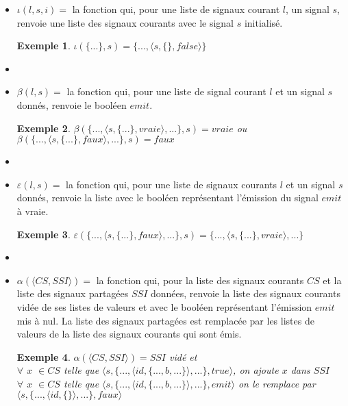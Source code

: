 \documentclass[10pt,a4paper]{report}
\newtheorem{ex}{Exemple}
\begin{document}
\begin{itemize}
		\item[] $\iota(l,s,i) =$ la fonction qui, pour une liste de signaux courant $l$, un signal $s$, renvoie une liste des signaux courants avec le signal $s$ initialisé.
		\begin{ex}
			$\iota(\{...\},s) = \{...,\langle s,\{\},false\rangle\}$
		\end{ex}
		\item[]
		
		\item[] $\beta(l,s) =$ la fonction qui, pour une liste de signal courant $l$ et un signal $s$ donnés, renvoie le booléen $emit$.
		\begin{ex}
			$\beta(\{...,\langle s,\{...\},vraie\rangle,...\},s) = vraie$ ou $\beta(\{...,\langle s,\{...\},faux\rangle,...\},s) = faux$
		\end{ex}
		\item[] 
		
		\item[] $\varepsilon(l,s) =$ la fonction qui, pour une liste de signaux courants $l$ et un signal $s$ donnés, renvoie la liste avec le booléen représentant l'émission du signal $emit$ à vraie.
		\begin{ex}
			$\varepsilon(\{...,\langle s,\{...\},faux\rangle,...\},s) = \{...,\langle s,\{...\},vraie\rangle,...\}$
		\end{ex}
		\item[] 
		
		\item[] $\alpha(\langle CS,SSI\rangle) =$ la fonction qui, pour la liste des signaux courants $CS$ et la liste des signaux partagées $SSI$ données, renvoie la liste des signaux courants vidée de ses listes de valeurs et avec le booléen représentant l'émission $emit$ mis à nul. La liste des signaux partagées est remplacée par les listes de valeurs de la liste des signaux courants qui sont émis.
		\begin{ex}
			$\alpha(\langle CS,SSI\rangle) = SSI$ vidé et
			\\ $\forall$ $x$ $\in CS$ telle que $\langle s,\{...,\langle id,\{...,b,...\}\rangle,...\},true\rangle$, on ajoute $x$ dans $SSI$
			\\ $\forall$ $x$ $\in CS$ telle que $\langle s,\{...,\langle id,\{...,b,...\}\rangle,...\},emit\rangle$ on le remplace par $\langle s,\{...,\langle id,\{\}\rangle,...\},faux\rangle$  
		\end{ex}
	\end{itemize}
	\newpage
	
\end{document}
